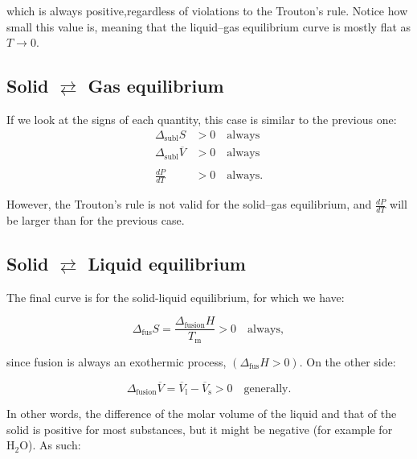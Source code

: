 \documentclass[
  9pt,
]{extbook}
\theoremstyle{definition}
\theoremstyle{definition}
\theoremstyle{definition}
\theoremstyle{definition}
\theoremstyle{remark}
\begin{document}
which is always positive,regardless of violations to the Trouton's rule. Notice how small this value is, meaning that the liquid--gas equilibrium curve is mostly flat as \(T\rightarrow 0\).

\subsection{\texorpdfstring{Solid \(\rightleftarrows\) Gas equilibrium}{Solid \textbackslash rightleftarrows Gas equilibrium}}\label{solid-rightleftarrows-gas-equilibrium}

If we look at the signs of each quantity, this case is similar to the previous one:
\begin{equation}
\begin{aligned}
\Delta_{\text{subl}} S &> 0 \quad \text{always} \\
\Delta_{\text{subl}} \overline{V }&> 0 \quad \text{always} \\
\\
\frac{dP}{dT} &> 0 \quad \text{always}.
\end{aligned}
\label{eq:PTdi1}
\end{equation}

However, the Trouton's rule is not valid for the solid--gas equilibrium, and \(\frac{dP}{dT}\) will be larger than for the previous case.

\subsection{\texorpdfstring{Solid \(\rightleftarrows\) Liquid equilibrium}{Solid \textbackslash rightleftarrows Liquid equilibrium}}\label{solid-rightleftarrows-liquid-equilibrium}

The final curve is for the solid-liquid equilibrium, for which we have:

\begin{equation}
\Delta_{\text{fus}} S = \frac{\Delta_{\text{fusion}} H}{T_{\text{m}}} > 0 \quad \text{always},
\label{eq:PTd1}
\end{equation}

since fusion is always an exothermic process, \((\Delta_{\text{fus}} H>0)\). On the other side:

\begin{equation}
\Delta_{\text{fusion}} \overline{V} = \overline{V}_{\text{l}} - \overline{V}_{\text{s}} > 0 \quad \text{generally}.
\end{equation}

In other words, the difference of the molar volume of the liquid and that of the solid is positive for most substances, but it might be negative (for example for \(\mathrm{H}_2\mathrm{O}\)). As such:
\end{document}
